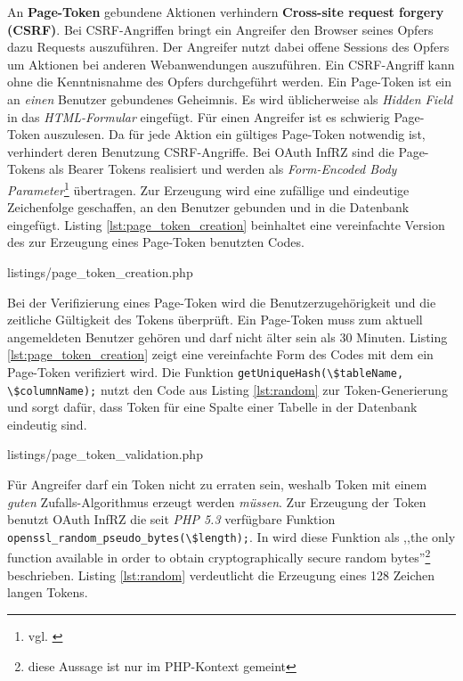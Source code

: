 \documentclass[12pt,a4paper,pointednumbers,abstracton]{scrartcl}
\newcommand{\code}[1]{\small\lstinline[style=InlinePHP]!#1!\normalsize}
\begin{document}
An \textbf{Page-Token} gebundene Aktionen verhindern \textbf{Cross-site request forgery (CSRF)}.
Bei CSRF-Angriffen bringt ein Angreifer den Browser seines Opfers dazu Requests auszuführen.
Der Angreifer nutzt dabei offene Sessions des Opfers um Aktionen bei anderen Webanwendungen auszuführen.
Ein CSRF-Angriff kann ohne die Kenntnisnahme des Opfers durchgeführt werden.
Ein Page-Token ist ein an \emph{einen} Benutzer gebundenes Geheimnis.
Es wird üblicherweise als \emph{Hidden Field} in das \emph{HTML-Formular} eingefügt.
Für einen Angreifer ist es schwierig Page-Token auszulesen.
Da für jede Aktion ein gültiges Page-Token notwendig ist, verhindert deren Benutzung CSRF-Angriffe.
Bei OAuth InfRZ sind die Page-Tokens als Bearer Tokens realisiert und werden als \emph{Form-Encoded Body Parameter}\footnote{vgl. \cite[Section 2.2]{RFC6750}} übertragen.
Zur Erzeugung wird eine zufällige und eindeutige Zeichenfolge geschaffen, an den Benutzer gebunden und in die Datenbank eingefügt.
Listing \ref{lst:page_token_creation} beinhaltet eine vereinfachte Version des zur Erzeugung eines Page-Token benutzten Codes.

\begin{minipage}{\textwidth}
	
	{listings/page_token_creation.php}
\end{minipage} 

Bei der Verifizierung eines Page-Token wird die Benutzerzugehörigkeit und die zeitliche Gültigkeit des Tokens überprüft.
Ein Page-Token muss zum aktuell angemeldeten Benutzer gehören und darf nicht älter sein als 30 Minuten.
Listing \ref{lst:page_token_creation} zeigt eine vereinfachte Form des Codes mit dem ein Page-Token verifiziert wird.
Die Funktion \code{getUniqueHash(\$tableName, \$columnName);} nutzt den Code aus Listing \ref{lst:random} zur Token-Generierung und sorgt dafür, dass Token für eine Spalte einer Tabelle in der Datenbank eindeutig sind.

\begin{minipage}{\textwidth}
	
	{listings/page_token_validation.php}
\end{minipage}

Für Angreifer darf ein Token nicht zu erraten sein, weshalb Token mit einem \emph{guten} Zufalls-Algorithmus erzeugt werden \emph{müssen}.
Zur Erzeugung der Token benutzt OAuth InfRZ die seit \emph{PHP 5.3} verfügbare Funktion \code{openssl_random_pseudo_bytes(\$length);}.
In \cite[Section 2.2]{AK12} wird diese Funktion als ,,the only function available in order to obtain cryptographically secure random bytes''\footnote{diese Aussage ist nur im PHP-Kontext gemeint} beschrieben.
Listing \ref{lst:random} verdeutlicht die Erzeugung eines 128 Zeichen langen Tokens.
\end{document}
